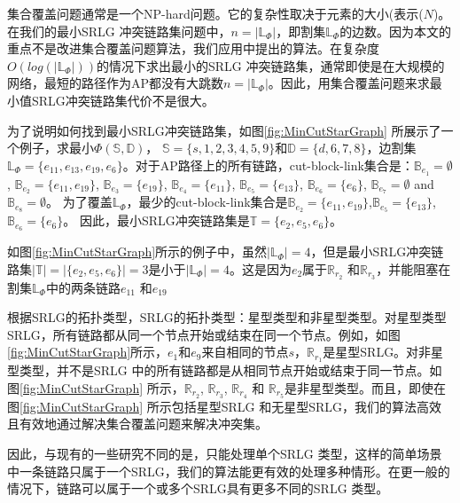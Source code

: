 集合覆盖问题通常是一个NP-hard问题。它的复杂性取决于元素的大小(表示($N$)。 在我们的最小SRLG 冲突链路集问题中，$n=|\mathbb{L}_{\Phi}|$，即割集$\mathbb{L}_{\Phi}$的边数。因为本文的重点不是改进集合覆盖问题算法，我们应用\cite{chvatal1979greedy}中提出的算法。在复杂度$O(log(|\mathbb{L}_{\Phi}|))$的情况下求出最小的SRLG 冲突链路集，通常即使是在大规模的网络，最短的路径作为AP都没有大跳数$n=|\mathbb{L}_{\Phi}|$。因此，用集合覆盖问题来求最小值SRLG冲突链路集代价不是很大。

为了说明如何找到最小SRLG冲突链路集，如图\ref{fig:MinCutStarGraph} 所展示了一个例子，求最小$\Phi(\mathbb{S},\mathbb{D})$， $\mathbb{S}=\{s, 1, 2, 3, 4, 5, 9\}$和$\mathbb{D}=\{d, 6, 7, 8\}$，边割集$\mathbb{L}_{\Phi}=\{e_{11},e_{13},e_{19},e_{6}\}$。对于AP路径上的所有链路，cut-block-link集合是：$\mathbb{B}_{e_1}=\emptyset$, $\mathbb{B}_{e_2}=\{e_{11},e_{19}\}$, $\mathbb{B}_{e_3}=\{e_{19}\}$, $\mathbb{B}_{e_4}=\{e_{11}\}$, $\mathbb{B}_{e_5}=\{e_{13}\}$, $\mathbb{B}_{e_6}=\{e_6\}$, $\mathbb{B}_{e_7}=\emptyset$ and $\mathbb{B}_{e_8}=\emptyset$。 为了覆盖$\mathbb{L}_{\Phi}$，最少的cut-block-link集合是$\mathbb{B}_{e_2}=\{e_{11},e_{19}\}$,$\mathbb{B}_{e_5}=\{e_{13}\}$,$\mathbb{B}_{e_6}=\{e_6\}$。 因此，最小SRLG冲突链路集是$\mathbb{T}=\{e_2, e_5, e_6 \}$。

如图\ref{fig:MinCutStarGraph}所示的例子中，虽然$|\mathbb{L}_{\Phi}|=4$，但是最小SRLG冲突链路集$|\mathbb{T}|=|\{e_2, e_5, e_6 \}|=3$是小于$|\mathbb{L}_{\Phi}|=4$。这是因为$e_2$属于$\mathbb{R}_{r_2}$ 和$\mathbb{R}_{r_3}$，并能阻塞在割集$\mathbb{L}_{\Phi}$中的两条链路$e_{11}$ 和$e_{19}$


根据SRLG的拓扑类型\cite{datta2008graph}，SRLG的拓扑类型：星型类型和非星型类型。对星型类型SRLG，所有链路都从同一个节点开始或结束在同一个节点。例如，如图\ref{fig:MinCutStarGraph}所示，$e_1$和$e_9$来自相同的节点$s$，$\mathbb{R}_{r_1}$是星型SRLG。对非星型类型，并不是SRLG 中的所有链路都是从相同节点开始或结束于同一节点。如图\ref{fig:MinCutStarGraph} 所示，$\mathbb{R}_{r_2}$, $\mathbb{R}_{r_3}$, $\mathbb{R}_{r_4}$ 和 $\mathbb{R}_{r_5}$是非星型类型。而且，即使在图\ref{fig:MinCutStarGraph} 所示包括星型SRLG 和无星型SRLG，我们的算法高效且有效地通过解决集合覆盖问题来解决冲突集。


因此，与现有的一些研究不同的是，\cite{datta2008graph}只能处理单个SRLG 类型，这样的简单场景中一条链路只属于一个SRLG，我们的算法能更有效的处理多种情形。在更一般的情况下，链路可以属于一个或多个SRLG具有更多不同的SRLG 类型。


